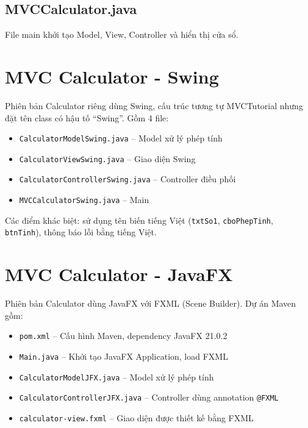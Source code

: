 \documentclass[12pt,a4paper]{article}
\begin{document}
\subsection{MVCCalculator.java}
File main khởi tạo Model, View, Controller và hiển thị cửa sổ.

\section{MVC Calculator - Swing}

Phiên bản Calculator riêng dùng Swing, cấu trúc tương tự MVCTutorial nhưng đặt tên class có hậu tố ``Swing''. Gồm 4 file:

\begin{itemize}
    \item \texttt{CalculatorModelSwing.java} -- Model xử lý phép tính
    \item \texttt{CalculatorViewSwing.java} -- Giao diện Swing
    \item \texttt{CalculatorControllerSwing.java} -- Controller điều phối
    \item \texttt{MVCCalculatorSwing.java} -- Main
\end{itemize}

Các điểm khác biệt: sử dụng tên biến tiếng Việt (\texttt{txtSo1}, \texttt{cboPhepTinh}, \texttt{btnTinh}), thông báo lỗi bằng tiếng Việt.

\section{MVC Calculator - JavaFX}

Phiên bản Calculator dùng JavaFX với FXML (Scene Builder). Dự án Maven gồm:

\begin{itemize}
    \item \texttt{pom.xml} -- Cấu hình Maven, dependency JavaFX 21.0.2
    \item \texttt{Main.java} -- Khởi tạo JavaFX Application, load FXML
    \item \texttt{CalculatorModelJFX.java} -- Model xử lý phép tính
    \item \texttt{CalculatorControllerJFX.java} -- Controller dùng annotation \texttt{@FXML}
    \item \texttt{calculator-view.fxml} -- Giao diện được thiết kế bằng FXML
\end{itemize}
\end{document}
